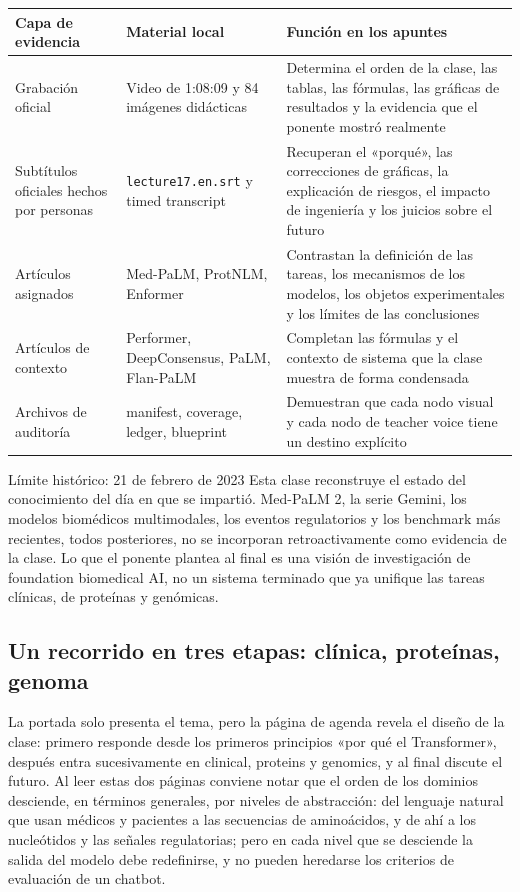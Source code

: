 \documentclass[a4paper]{article}
\begin{document}
\begin{longtable}{@{}L{0.18\textwidth}L{0.28\textwidth}L{0.42\textwidth}@{}}
\toprule
Capa de evidencia & Material local & Función en los apuntes \\
\midrule
Grabación oficial & Video de 1:08:09 y 84 imágenes didácticas & Determina el orden de la clase, las tablas, las fórmulas, las gráficas de resultados y la evidencia que el ponente mostró realmente \\
Subtítulos oficiales hechos por personas & \texttt{lecture17.en.srt} y timed transcript & Recuperan el «porqué», las correcciones de gráficas, la explicación de riesgos, el impacto de ingeniería y los juicios sobre el futuro \\
Artículos asignados & Med-PaLM, ProtNLM, Enformer & Contrastan la definición de las tareas, los mecanismos de los modelos, los objetos experimentales y los límites de las conclusiones \\
Artículos de contexto & Performer, DeepConsensus, PaLM, Flan-PaLM & Completan las fórmulas y el contexto de sistema que la clase muestra de forma condensada \\
Archivos de auditoría & manifest, coverage, ledger, blueprint & Demuestran que cada nodo visual y cada nodo de teacher voice tiene un destino explícito \\
\bottomrule
\end{longtable}

\begin{warningbox}{Límite histórico: 21 de febrero de 2023}
Esta clase reconstruye el estado del conocimiento del día en que se impartió. Med-PaLM 2, la serie Gemini, los modelos biomédicos multimodales, los eventos regulatorios y los benchmark más recientes, todos posteriores, no se incorporan retroactivamente como evidencia de la clase. Lo que el ponente plantea al final es una visión de investigación de foundation biomedical AI, no un sistema terminado que ya unifique las tareas clínicas, de proteínas y genómicas.
\end{warningbox}

\subsection{Un recorrido en tres etapas: clínica, proteínas, genoma}

La portada solo presenta el tema, pero la página de agenda revela el diseño de la clase: primero responde desde los primeros principios «por qué el Transformer», después entra sucesivamente en clinical, proteins y genomics, y al final discute el futuro. Al leer estas dos páginas conviene notar que el orden de los dominios desciende, en términos generales, por niveles de abstracción: del lenguaje natural que usan médicos y pacientes a las secuencias de aminoácidos, y de ahí a los nucleótidos y las señales regulatorias; pero en cada nivel que se desciende la salida del modelo debe redefinirse, y no pueden heredarse los criterios de evaluación de un chatbot.
\end{document}
